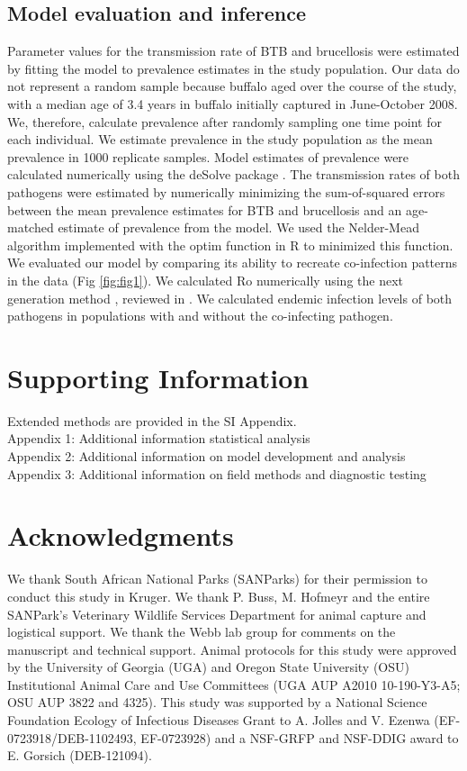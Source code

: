 \documentclass[10pt,letterpaper]{article}
\begin{document}
\subsection*{Model evaluation and inference}
Parameter values for the transmission rate of BTB and brucellosis were estimated by fitting the model to prevalence estimates in the study population. Our data do not represent a random sample because buffalo aged over the course of the study, with a median age of 3.4 years in buffalo initially captured in June-October 2008. We, therefore,  calculate prevalence after randomly sampling one time point for each individual.  We estimate prevalence in the study population as the mean prevalence in 1000 replicate samples. Model estimates of prevalence were calculated numerically using the deSolve package \cite{desolve_package}. The transmission rates of both pathogens were estimated by numerically minimizing the sum-of-squared errors between the mean prevalence estimates for BTB and brucellosis and an age-matched estimate of prevalence from the model. We used the Nelder-Mead algorithm implemented with the optim function in R to minimized this function. We evaluated our model by comparing its ability to recreate co-infection patterns in the data (Fig \ref{fig:fig1}). We calculated Ro numerically using the next generation method \cite{van_den_driessche_reproduction_2002}, reviewed in \cite{heffernan_perspectives_2005}. We calculated endemic infection levels of both pathogens in populations with and without the co-infecting pathogen.

\section*{Supporting Information}
Extended methods are provided in the SI Appendix. \\
\noindent{}Appendix 1: Additional information statistical analysis \\
\noindent{}Appendix 2: Additional information on model development and analysis \\
\noindent{}Appendix 3: Additional information on field methods and diagnostic testing \\


\section*{Acknowledgments}
We thank South African National Parks (SANParks) for their permission to conduct this study in Kruger. We thank P. Buss, M. Hofmeyr and the entire SANPark’s Veterinary Wildlife Services Department for animal capture and logistical support. We thank the Webb lab group for comments on the manuscript and technical support. Animal protocols for this study were approved by the University of Georgia (UGA) and Oregon State University (OSU) Institutional Animal Care and Use Committees (UGA AUP A2010 10-190-Y3-A5; OSU AUP 3822 and 4325). This study was supported by a National Science Foundation Ecology of Infectious Diseases Grant to A. Jolles and V. Ezenwa (EF-0723918/DEB-1102493, EF-0723928) and a NSF-GRFP and NSF-DDIG award to E. Gorsich (DEB-121094).
\nolinenumbers
\end{document}
